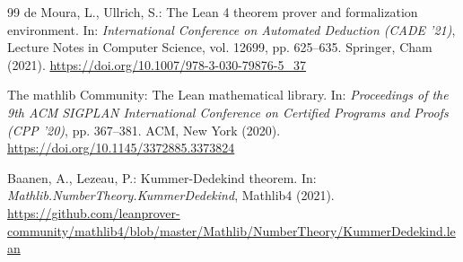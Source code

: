 \documentclass[11pt,a4paper]{article}
\theoremstyle{plain}
\theoremstyle{definition}
\numberwithin{equation}{section}
\begin{document}
\begin{thebibliography}{99}
de Moura, L., Ullrich, S.:
The Lean 4 theorem prover and formalization environment.
In: \emph{International Conference on Automated Deduction (CADE '21)}, Lecture Notes in Computer Science, vol. 12699, pp. 625--635. Springer, Cham (2021). \url{https://doi.org/10.1007/978-3-030-79876-5_37}

The mathlib Community:
The Lean mathematical library.
In: \emph{Proceedings of the 9th ACM SIGPLAN International Conference on Certified Programs and Proofs (CPP '20)}, pp. 367--381. ACM, New York (2020). \url{https://doi.org/10.1145/3372885.3373824}

Baanen, A., Lezeau, P.:
Kummer-Dedekind theorem.
In: \emph{Mathlib.NumberTheory.KummerDedekind}, Mathlib4 (2021).
\url{https://github.com/leanprover-community/mathlib4/blob/master/Mathlib/NumberTheory/KummerDedekind.lean}

\end{thebibliography}
\end{document}

